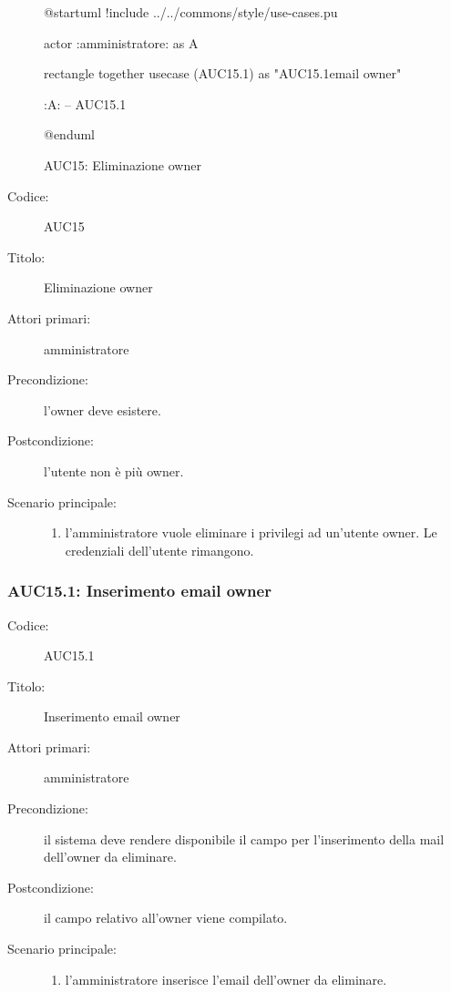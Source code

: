 \documentclass[../../../analisi-dei-requisiti.tex]{subfiles}
\begin{document}
\begin{figure}[H]
  \centering
  \begin{plantuml}
  @startuml
  !include ../../commons/style/use-cases.pu

  actor :amministratore: as A

  rectangle {
    together {
      usecase (AUC15.1) as "AUC15.1\nInserimento email owner"
    }
  }

  :A: -- AUC15.1

  @enduml
  \end{plantuml}
  \caption{AUC15: Eliminazione owner}
  \label{fig:auc15}
\end{figure}

\begin{description}
  \item[Codice:] AUC15
  \item[Titolo:] Eliminazione owner
  \item[Attori primari:] amministratore
  \item[Precondizione:] l'owner deve esistere.
  \item[Postcondizione:] l'utente non è più owner.
  \item[Scenario principale:]
  \begin{enumerate}
    \item l'amministratore vuole eliminare i privilegi ad un'utente owner. Le credenziali dell'utente rimangono.
  \end{enumerate}
\end{description}

\subsubsection{AUC15.1: Inserimento email owner}%
\label{subs:AUC15.1}
\begin{description}
  \item[Codice:] AUC15.1
  \item[Titolo:] Inserimento email owner
  \item[Attori primari:] amministratore
  \item[Precondizione:] il sistema deve rendere disponibile il campo per l'inserimento della mail dell'owner da eliminare.
  \item[Postcondizione:] il campo relativo all'owner viene compilato.
  \item[Scenario principale:]
  \begin{enumerate}
    \item l'amministratore inserisce l'email dell'owner da eliminare.
  \end{enumerate}
\end{description}
\end{document}
